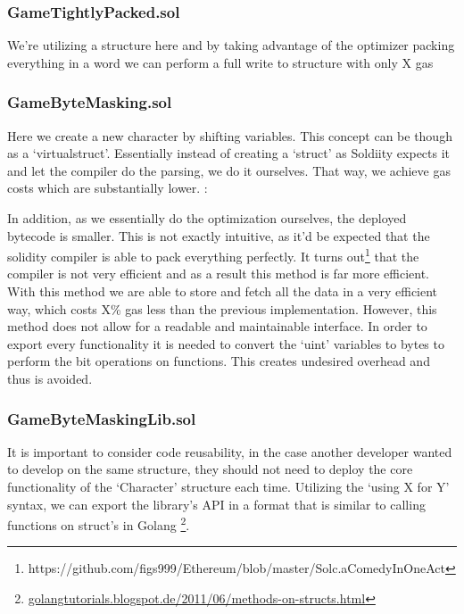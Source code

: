 \subsubsection{GameTightlyPacked.sol}
We're utilizing a structure here and by taking advantage of the optimizer packing everything in a word we can perform a full write to structure with only X gas 

% 

\subsubsection{GameByteMasking.sol}
Here we create a new character by shifting variables. This concept can be though as a `virtualstruct'. Essentially instead of creating a `struct' as Soldiity expects it and let the compiler do the parsing, we do it ourselves. That way, we achieve gas costs which are substantially lower.
% 
:

In addition, as we essentially do the optimization ourselves, the deployed bytecode is smaller. 
This is not exactly intuitive, as it'd be expected that the solidity compiler is able to pack everything perfectly. It turns out\footnote{https://github.com/figs999/Ethereum/blob/master/Solc.aComedyInOneAct} that the compiler is not very efficient and as a result this method is far more efficient. With this method we are able to store and fetch all the data in a very efficient way, which costs X\% gas less than the previous implementation. However, this method does not allow for a readable and maintainable interface. In order to export every functionality it is needed to convert the `uint' variables to bytes to perform the bit operations on functions. This creates undesired overhead and thus is avoided.

\subsubsection{GameByteMaskingLib.sol}
It is important to consider code reusability, in the case another developer wanted to develop on the same structure, they should not need to deploy the core functionality of the `Character' structure each time. Utilizing the `using X for Y' syntax, we can export the library's API in a format that is similar to calling functions on struct's in Golang \footnote{\url{ golangtutorials.blogspot.de/2011/06/methods-on-structs.html}}.

